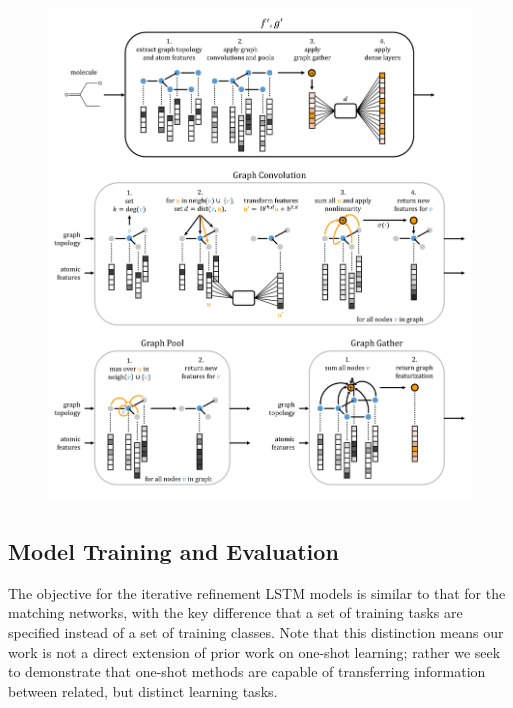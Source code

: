 \documentclass[journal=jacsat,manuscript=article]{achemso}
\begin{document}
\begin{figure}[H]
\includegraphics[width=\textwidth]{graphconv_graphic_v2.png}
\label{conv}
\end{figure}


\subsection{Model Training and Evaluation}
The objective for the iterative refinement LSTM models is similar to that for the matching networks, with the key difference that a set of training tasks are specified instead of a set of training classes. Note that this distinction means our work is not a direct extension of prior work on one-shot learning; rather we seek to demonstrate that one-shot methods are capable of transferring information between related, but distinct learning tasks. 
\end{document}
